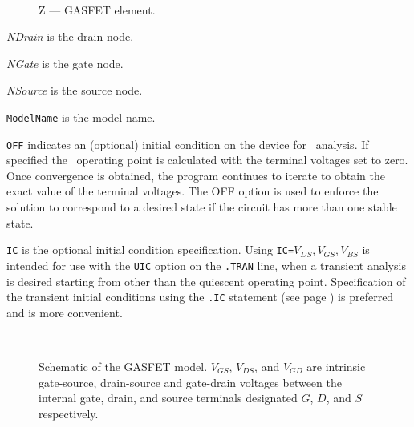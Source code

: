 \label{ZSPICE3element}
\begin{figure}[h]
\centering
\ 
\caption{Z --- GASFET element.
\label{zspice3.ps}}
\end{figure}




\begin{widelist}
\item[{\it NDrain}] is the drain node.
\item[{\it NGate}] is the gate node.
\item[{\it NSource}] is the source node.
\item[{\tt ModelName}]  is  the  model name.
\item[{\tt OFF}] indicates an (optional) initial condition on the device for
\dc\ analysis.  If specified the \dc\ operating point is calculated with the
terminal voltages set to zero.  Once convergence is obtained, the
program continues to iterate to obtain the exact  value of
the  terminal  voltages.  The OFF option is used to enforce the solution
to  correspond  to  a  desired  state if the circuit has more than one stable
state.
\item[{\tt IC}] is the optional  initial condition specification.
Using {\tt IC=}$V_{DS},V_{GS}, V_{BS}$
is intended for use with the {\tt UIC} option
on  the  {\tt .TRAN}  line,  when  a transient analysis is desired
starting from other than the quiescent operating point.
Specification of the transient initial conditions using the {\tt .IC}
statement (see page \pageref{.ICstatement}) is preferred and is more
convenient.
\end{widelist}


%
%
\label{ZGASFETmodel}
\label{GASFETmodelsp3}
\begin{figure}[h]
\centering
\ \epsfxsize=2.75in
\caption[Schematic of the \spicethree\ GASFET model]{Schematic of the \spicethree
GASFET model. \label{zspice3gasfet} $V_{GS}$, $V_{DS}$, and $V_{GD}$ are intrinsic
gate-source, drain-source and gate-drain voltages
between the internal gate, drain, and source terminals designated
$G$, $D$, and $S$ respectively.  }
\end{figure}
\vfill
{}

